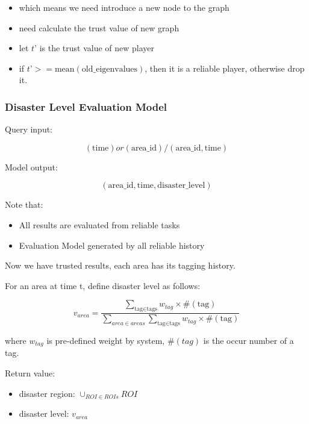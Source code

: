 \documentclass[paper=a4, fontsize=11pt]{scrartcl} %
\numberwithin{equation}{section} %
\numberwithin{figure}{section} %
\numberwithin{table}{section} %
\begin{document}
    \begin{itemize}
      \item which means we need introduce a new node to the graph
      \item need calculate the trust value of new graph
      \item let $t’$ is the trust value of new player
      \item if $t’ >= \text{mean}(\text{old\_eigenvalues})$, then it is a reliable player, otherwise drop it.
    \end{itemize}

    \subsubsection{Disaster Level Evaluation Model}

    Query input:

    \[
    (\text{time}) or (\text{area\_id})/(\text{area\_id}, \text{time})
    \]

    Model output:

    \[
    (\text{area\_id}, \text{time}, \text{disaster\_level})
    \]

    Note that:

    \begin{itemize}
      \item All results are evaluated from reliable tasks
      \item Evaluation Model generated by all reliable history
    \end{itemize}

    Now we have trusted results, each area has its tagging history.

    For an area at time t, define disaster level as follows:

    \[
    v_{area} = \frac{
    \sum_{\text{tag}\in\text{tags}}
      {w_{tag}\times\#(\text{tag})}
    }
    {\sum_{area\in areas}{\sum_{\text{tag}\in\text{tags}}{w_{tag}\times\#(\text{tag})}}}
    \]

    where $w_{tag}$ is pre-defined weight by system, $\#(tag)$ is the occur number of a tag.

    Return value:

    \begin{itemize}
      \item disaster region: $\cup_{ROI\in ROIs}{ROI}$
      \item disaster level: $v_{area}$
    \end{itemize}
\end{document}
